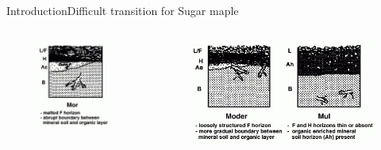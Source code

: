 \documentclass[table]{eecslides}
\begin{document}
\begin{frame}[t]{Introduction}{Difficult transition for Sugar maple}
\begin{columns}[c]
\begin{column}{.40\paperwidth}
	\end{column}
\end{columns}
\vspace{-1em}
\begin{columns}[c]
	\begin{column}{.40\paperwidth}
		\begin{figure}
			\includegraphics[width=.20\paperwidth]{Figs/mor.jpg}
		\end{figure}
	\end{column}
	\begin{column}{.40\paperwidth}
		\begin{figure}
			\includegraphics[width=.42\paperwidth]{Figs/moder_mull.jpg}
		\end{figure}
	\end{column}
\end{columns}

\footnotesize {\cite{Lavender1990}}
\end{frame}

\end{document}
